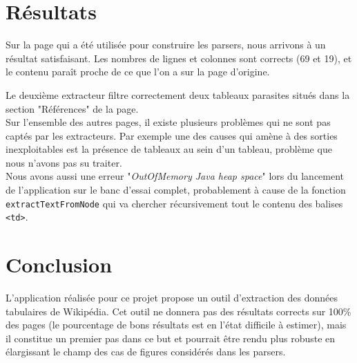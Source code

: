 \documentclass[french]{article}
\begin{document}
\newpage

\section{Résultats}

Sur la page qui a été utilisée pour construire les parsers, nous arrivons à un résultat satisfaisant. Les nombres de lignes et colonnes sont corrects (69 et 19), et le contenu paraît proche de ce que l'on a sur la page d'origine.

Le deuxième extracteur filtre correctement deux tableaux parasites situés dans la section "Références" de la page.\\

Sur l'ensemble des autres pages, il existe plusieurs problèmes qui ne sont pas captés par les extracteurs. Par exemple une des causes qui amène à des sorties inexploitables est la présence de tableaux au sein d'un tableau, problème que nous n'avons pas su traiter.\\

Nous avons aussi une erreur "\textit{OutOfMemory Java heap space}" lors du lancement de l'application sur le banc d'essai complet, probablement à cause de la fonction \texttt{extractTextFromNode}  qui va chercher récursivement tout le contenu des balises \texttt{<td>}.

\section{Conclusion}

L'application réalisée pour ce projet propose un outil d'extraction des données tabulaires de Wikipédia. Cet outil ne donnera pas des résultats corrects sur 100\% des pages (le pourcentage de bons résultats est en l'état difficile à estimer), mais il constitue un premier pas dans ce but et pourrait être rendu plus robuste en élargissant le champ des cas de figures considérés dans les parsers.
	
\end{document}
